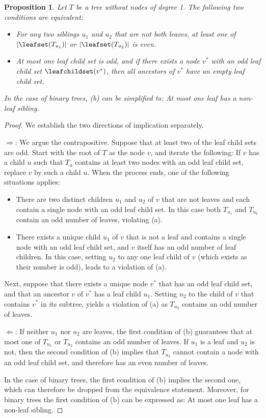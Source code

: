 \documentclass[11pt]{article}
\numberwithin{equation}{section}
\newtheorem{proposition}[theorem]{Proposition}
\theoremstyle{definition}
\theoremstyle{plain}
\begin{document}
\begin{proposition}\label{prop:connectivity:equivalence}
Let $T$ be a tree without nodes of degree 1. The following two conditions are equivalent:
\begin{itemize}
\item[(a)] For any two siblings $u_1$ and $u_2$ that are not both leaves, at least one of $\lvert\leafset(T_{u_1})\rvert$ or $\lvert\leafset(T_{u_2})\rvert$ is even.
\item[(b)] At most one leaf child set is odd, and if there exists a node $v^*$ with an odd leaf child set $\leafchildset(v^*)$, then all ancestors of $v^*$ have an empty leaf child set.
\end{itemize}
In the case of binary trees, (b) can be simplified to: At most one leaf has a non-leaf sibling.
\end{proposition}
\begin{proof}
We establish the two directions of implication separately. 

\medskip

\noindent
$\Rightarrow$: We argue the contrapositive. Suppose that at least two of the leaf child sets are odd. Start with the root of $T$ as the node $v$, and iterate the following: If $v$ has a child $u$ such that $T_u$ contains at least two nodes with an odd leaf child set, replace $v$ by such a child $u$. When the process ends, one of the following situations applies:
\begin{itemize}
\item There are two distinct children $u_1$ and $u_2$ of $v$ that are not leaves and each contain a single node with an odd leaf child set. In this case both $T_{u_1}$ and $T_{u_2}$ contain an odd number of leaves, violating (a).
\item There exists a unique child $u_1$ of $v$ that is not a leaf and contains a single node with an odd leaf child set, and $v$ itself has an odd number of leaf children. In this case, setting $u_2$ to any one leaf child of $v$ (which exists as their number is odd), leads to a violation of (a).
\end{itemize} 
Next, suppose that there exists a unique node $v^*$ that has an odd leaf child set, and that an ancestor $v$ of $v^*$ has a leaf child $u_1$. Setting $u_2$ to the child of $v$ that contains $v^*$ in its subtree, yields a violation of (a) as $T_{u_2}$ contains an odd number of leaves.

\medskip

\noindent
$\Leftarrow$: If neither $u_1$ nor $u_2$ are leaves, the first condition of (b) guarantees that at most one of $T_{u_1}$ or $T_{u_2}$ contains an odd number of leaves. If $u_1$ is a leaf and $u_2$ is not, then the second condition of (b) implies that $T_{u_2}$ cannot contain a node with an odd leaf child set, and therefore has an even number of leaves.

\medskip

In the case of binary trees, the first condition of (b) implies the second one, which can therefore be dropped from the equivalence statement. Moreover, for binary trees the first condition of (b) can be expressed as: At most one leaf has a non-leaf sibling.
\end{proof}
\end{document}
